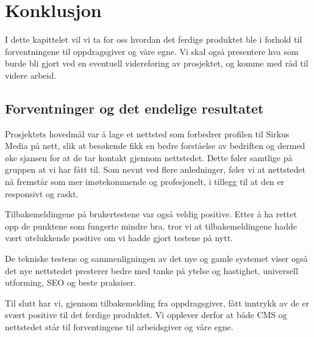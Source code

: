\cleardoublepage
\chapter{Konklusjon}
\label{chap:conclusion} 

I dette kapittelet vil vi ta for oss hvordan det ferdige produktet ble i forhold til forventningene til oppdragsgiver og våre egne.  Vi skal også presentere hva som burde bli gjort ved en eventuell videreføring av prosjektet, og komme med råd til videre arbeid.

\section{Forventninger og det endelige resultatet}
Prosjektets hovedmål var å lage et nettsted som forbedrer profilen til Sirkus Media på nett, slik at besøkende fikk en bedre forståelse av bedriften og dermed øke sjansen for at de tar kontakt gjennom nettstedet. Dette føler samtlige på gruppen at vi har fått til. Som nevnt ved flere anledninger, føler vi at nettstedet nå fremstår som mer imøtekommende og profesjonelt, i tillegg til at den  er responsivt og raskt.

Tilbakemeldingene på brukertestene var også veldig positive. Etter å ha rettet opp de punktene som fungerte mindre bra, tror vi at tilbakemeldingene hadde vært utelukkende positive om vi hadde gjort testene på nytt. 

De tekniske testene og sammenligningen av det nye og gamle systemet viser også det nye nettstedet presterer bedre med tanke på ytelse og hastighet, universell utforming, SEO og beste praksiser.

Til slutt har vi, gjennom tilbakemelding fra oppdragsgiver, fått inntrykk av de er svært positive til det ferdige produktet. Vi opplever derfor at både CMS og nettstedet står til forventingene til arbeidsgiver og våre egne.

